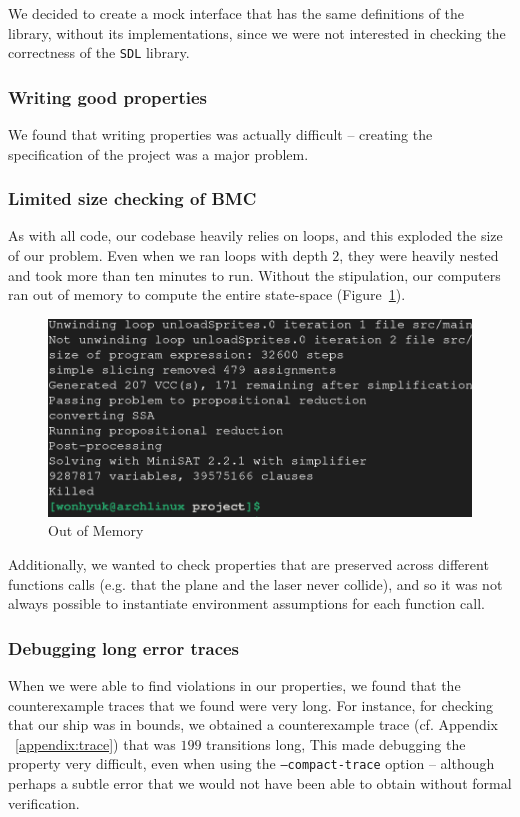 \documentclass{article}
\begin{document}
We decided to create a mock interface that has the same definitions of the library, without its implementations,
since we were not interested in checking the correctness of the \texttt{SDL} library.

\subsubsection{Writing good properties}
We found that writing properties was actually difficult -- creating the specification of the project was a major problem.


\subsubsection{Limited size checking of BMC}
As with all code, our codebase heavily relies on loops, and this exploded the size of our problem.
Even when we ran loops with depth $2$, they were heavily nested and took more than ten minutes to run.
Without the stipulation, our computers ran out of memory to compute the entire state-space (Figure~\ref{fig:killed}).
\begin{figure}[h!]
    \includegraphics[width=\linewidth]{killed.png}
    \caption{Out of Memory}
    \label{fig:killed}
\end{figure}

Additionally, we wanted to check properties that are preserved across different functions calls (e.g. that the plane and the laser never collide), and so it was not always possible to instantiate environment assumptions for each function call.


\subsubsection{Debugging long error traces}
When we were able to find violations in our properties, we found that the counterexample traces that we found were very long.
For instance, for checking that our ship was in bounds, we obtained a counterexample trace (cf. Appendix ~\ref{appendix:trace}) that was $199$ transitions long,
This made debugging the property very difficult, even when using the \texttt{--compact-trace} option -- 
although perhaps a subtle error that we would not have been able to obtain without formal verification.
\end{document}
